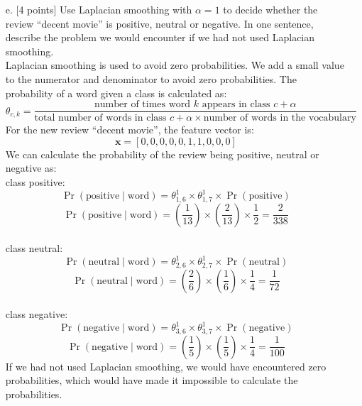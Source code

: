 \documentclass[a3paper,12pt]{extarticle} %
\begin{document}
\begin{enumerate}
    \item[e.] [4 points] Use Laplacian smoothing with $\alpha = 1$ to decide whether the review ``decent movie'' is positive, neutral or negative. In one sentence, describe the problem we would encounter if we had not used Laplacian smoothing.
    \\ Laplacian smoothing is used to avoid zero probabilities. We add a small value to the numerator and denominator to avoid zero probabilities. The probability of a word given a class is calculated as:
    \[
    \theta_{c,k} = \frac{\text{number of times word } k \text{ appears in class } c + \alpha}{\text{total number of words in class } c + \alpha \times \text{number of words in the vocabulary}}
    \]
    For the new review ``decent movie'', the feature vector is:
    \[
    \mathbf{x} = [0, 0, 0, 0, 0, 1, 1, 0, 0, 0]
    \]
    We can calculate the probability of the review being positive, neutral or negative as:
    \\ class positive:
    \[
    \Pr(\text{positive} \mid \text{word} ) = \theta_{1,6}^{1} \times \theta_{1,7}^{1} \times \Pr(\text{positive})
    \]
    \[
    \Pr(\text{positive} \mid \text{word} ) = \left( \frac{1}{13} \right) \times \left( \frac{2}{13} \right) \times \frac{1}{2} = \frac{2}{338}
    \]
    \\ class neutral:
    \[
    \Pr(\text{neutral} \mid \text{word} ) = \theta_{2,6}^{1} \times \theta_{2,7}^{1} \times \Pr(\text{neutral})
    \]
    \[
    \Pr(\text{neutral} \mid \text{word} ) = \left( \frac{2}{6} \right) \times \left( \frac{1}{6} \right) \times \frac{1}{4} = \frac{1}{72}
    \]
    \\ class negative:
    \[
    \Pr(\text{negative} \mid \text{word} ) = \theta_{3,6}^{1} \times \theta_{3,7}^{1} \times \Pr(\text{negative})
    \]
    \[
    \Pr(\text{negative} \mid \text{word} ) = \left( \frac{1}{5} \right) \times \left( \frac{1}{5} \right) \times \frac{1}{4} = \frac{1}{100}
    \]
    If we had not used Laplacian smoothing, we would have encountered zero probabilities, which would have made it impossible to calculate the probabilities.
\end{enumerate}
\newpage
\end{document}
